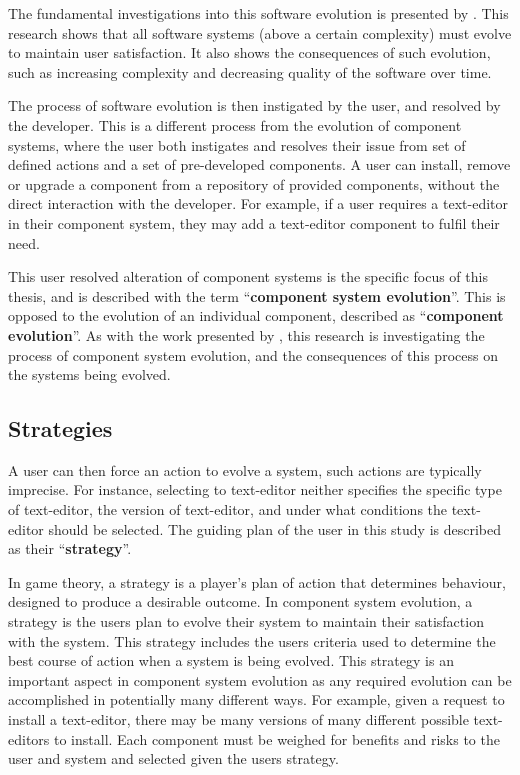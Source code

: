 The fundamental investigations into this software evolution is presented by \cite{lehman1980}.
This research shows that all software systems (above a certain complexity) must evolve to maintain user satisfaction.
It also shows the consequences of such evolution, such as increasing complexity and decreasing quality of the software over time.

The process of software evolution is then instigated by the user, and resolved by the developer.
This is a different process from the evolution of component systems, 
where the user both instigates and resolves their issue from set of defined actions and a set of pre-developed components.
A user can install, remove or upgrade a component from a repository of provided components, without the direct interaction with the developer. 
For example, if a user requires a text-editor in their component system, they may add a text-editor component to fulfil their need.

This user resolved alteration of component systems is the specific focus of this thesis, and is described with the term ``\textbf{component system evolution}''.
This is opposed to the evolution of an individual component, described as ``\textbf{component evolution}''.
As with the work presented by \cite{lehman1980}, 
this research is investigating the process of component system evolution, and the consequences of this process on the systems being evolved.

\subsection{Strategies}
A user can then force an action to evolve a system, such actions are typically imprecise.
For instance, selecting to text-editor neither specifies the specific type of text-editor, the version of text-editor,
and under what conditions the text-editor should be selected.
The guiding plan of the user in this study is described as their ``\textbf{strategy}''.

In game theory, a strategy is a player's plan of action that determines behaviour, designed to produce a desirable outcome.
In component system evolution, a strategy is the users plan to evolve their system to maintain their satisfaction with the system.
This strategy includes the users criteria used to determine the best course of action when a system is being evolved.
This strategy is an important aspect in component system evolution as any required evolution can be accomplished in potentially many different ways.
For example, given a request to install a text-editor, there may be many versions of many different possible text-editors to install.
Each component must be weighed for benefits and risks to the user and system and selected given the users strategy. 

